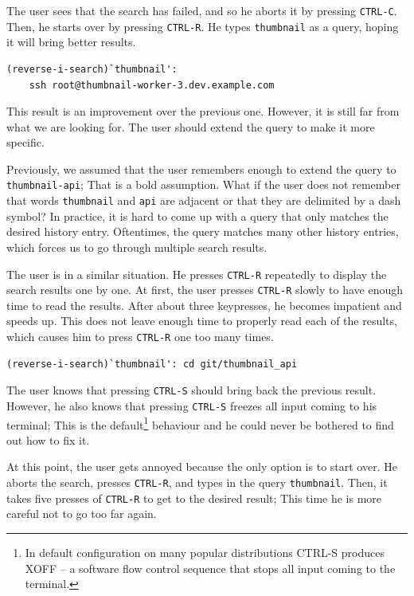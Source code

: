 The user sees that the search has failed, and so he aborts it by pressing \verb|CTRL-C|. Then, he starts over by pressing \verb|CTRL-R|. He types \verb|thumbnail| as a query, hoping it will bring better results.


\begin{verbatim}
(reverse-i-search)`thumbnail':
    ssh root@thumbnail-worker-3.dev.example.com
\end{verbatim}

This result is an improvement over the previous one. However, it is still far from what we are looking for. The user should extend the query to make it more specific. 

Previously, we assumed that the user remembers enough to extend the query to \verb|thumbnail-api|; That is a bold assumption. What if the user does not remember that words \verb|thumbnail| and \verb|api| are adjacent or that they are delimited by a dash symbol? In practice, it is hard to come up with a query that only matches the desired history entry. Oftentimes, the query matches many other history entries, which forces us to go through multiple search results.


The user is in a similar situation. He presses \verb|CTRL-R| repeatedly to display the search results one by one. At first, the user presses \verb|CTRL-R| slowly to have enough time to read the results. After about three keypresses, he becomes impatient and speeds up. This does not leave enough time to properly read each of the results, which causes him to press \verb|CTRL-R| one too many times.

\begin{verbatim}
(reverse-i-search)`thumbnail': cd git/thumbnail_api
\end{verbatim}

The user knows that pressing \verb|CTRL-S| should bring back the previous result. However, he also knows that pressing \verb|CTRL-S| freezes all input coming to his terminal; This is the default\footnote{In default configuration on many popular distributions CTRL-S produces XOFF -- a software flow control sequence that stops all input coming to the terminal.} behaviour and he could never be bothered to find out how to fix it.

At this point, the user gets annoyed because the only option is to start over. He aborts the search, presses \verb|CTRL-R|, and types in the query \verb|thumbnail|. Then, it takes five presses of \verb|CTRL-R| to get to the desired result; This time he is more careful not to go too far again.



